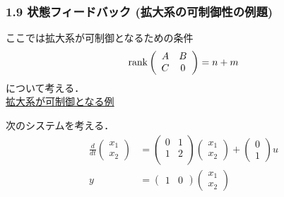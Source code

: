 \begin{frame}[t]
\frametitle{1.9 状態フィードバック (拡大系の可制御性の例題)}
ここでは拡大系が可制御となるための条件
\begin{equation}
   \mathop{\rm rank}\nolimits \left(\begin{array}{cc}
          A & B \\
    C & 0
         \end{array}\right)
   = n + m
\end{equation}
について考える．\\

\noindent
\underline{拡大系が可制御となる例}

次のシステムを考える．
\begin{align}
 \frac{d}{dt}
 \left(
 \begin{array}{c}
  x_1 \\
  x_2
 \end{array}
 \right) &=
 \left(
 \begin{array}{cc}
  0 & 1 \\
  1 & 2 \\
 \end{array}
 \right)
 \left(
 \begin{array}{c}
  x_1 \\
  x_2
 \end{array}
 \right) +
 \left(
 \begin{array}{c}
  0 \\
  1
 \end{array}
 \right) u \\
 y &=
 \left(
 \begin{array}{cc}
  1 & 0
 \end{array}
 \right)
 \left(
 \begin{array}{c}
  x_1 \\
  x_2
 \end{array}
 \right)
\end{align}
\end{frame}


